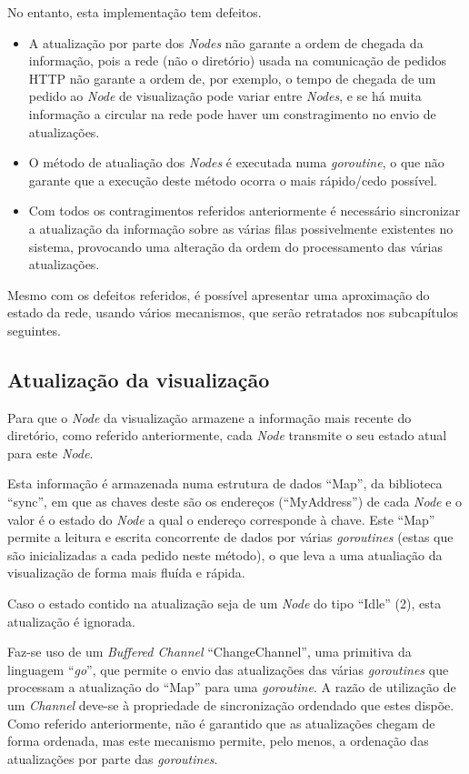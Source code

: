 No entanto, esta implementação tem defeitos. 
\begin{itemize}
	\item 
A atualização por parte dos \emph{Nodes} não garante a ordem de chegada da informação, pois a rede (não o diretório) usada
na comunicação de pedidos \acs{HTTP} não garante a ordem de, por exemplo, o tempo de chegada de um pedido ao \emph{Node} de visualização
pode variar entre \emph{Nodes}, e se há muita informação a circular na rede pode haver um constragimento no envio de atualizações.

	\item 
O método de atualiação dos \emph{Nodes} é executada numa \emph{goroutine}, o que não garante que a execução deste método 
ocorra o mais rápido/cedo possível.

	\item 
Com todos os contragimentos referidos anteriormente é necessário sincronizar a atualização da informação sobre as várias filas possivelmente existentes no sistema, provocando uma alteração da ordem do processamento das várias atualizações.

\end{itemize}

Mesmo com os defeitos referidos, é possível apresentar uma aproximação do estado da rede, usando vários mecanismos, que serão retratados nos subcapítulos seguintes.

\subsection*{Atualização da visualização}
Para que o \emph{Node} da visualização armazene a informação mais recente do diretório, como referido anteriormente,
cada \emph{Node} transmite o seu estado atual para este \emph{Node}.

Esta informação é armazenada numa estrutura de dados ``Map'', da biblioteca ``sync'', em que as chaves deste são os endereços (``MyAddress'') de cada 
\emph{Node} e o valor é o estado do \emph{Node} a qual o endereço corresponde à chave. Este ``Map'' permite a leitura e escrita concorrente de dados por várias \emph{goroutines} (estas que são inicializadas a cada pedido neste método), o que leva a uma atualiação da visualização de forma mais fluída e rápida.

Caso o estado contido na atualização seja de um \emph{Node} do tipo ``Idle'' (2), esta atualização é ignorada.

Faz-se uso de um \emph{Buffered Channel} ``ChangeChannel'', uma primitiva da linguagem ``\emph{go}'', que permite o envio das atualizações das várias \emph{goroutines} que processam a atualização do ``Map'' para uma \emph{goroutine}.
A razão de utilização de um \emph{Channel} deve-se à propriedade de sincronização ordendado que estes dispõe. Como referido anteriormente, não é garantido que as atualizações chegam de forma ordenada, mas este mecanismo permite, pelo menos, a ordenação das atualizações por parte das \emph{goroutines}.

